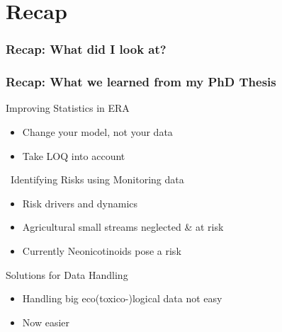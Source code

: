 \documentclass[
	12pt
	]{beamer}
\begin{document}
\section*{Recap}

\begingroup
\footnotesize %
\begin{frame}
\frametitle{Recap: What did I look at?}
    \vspace*{2mm}
	\resizebox{1.1\textwidth}{!}{
		\hspace*{-20mm}
	}
\end{frame}
\endgroup

\begin{frame}
\frametitle{Recap: What we learned from my PhD Thesis}
	\begin{exampleblock}{\checkmark Improving Statistics in ERA}
		\begin{itemize}
			\item Change your model, not your data
			\item Take LOQ into account
		\end{itemize}
	\end{exampleblock}

\pause
	\begin{exampleblock}{\checkmark~Identifying Risks using Monitoring data}
		\begin{itemize}
			\item Risk drivers and dynamics
			\item Agricultural small streams neglected \& at risk
			\item Currently Neonicotinoids pose a risk
		\end{itemize}
	\end{exampleblock}

\pause
	\begin{exampleblock}{\checkmark Solutions for Data Handling}
		\begin{itemize}
			\item Handling big eco(toxico-)logical data not easy
			\item Now easier
		\end{itemize}
	\end{exampleblock}
\end{frame}



\end{document}

